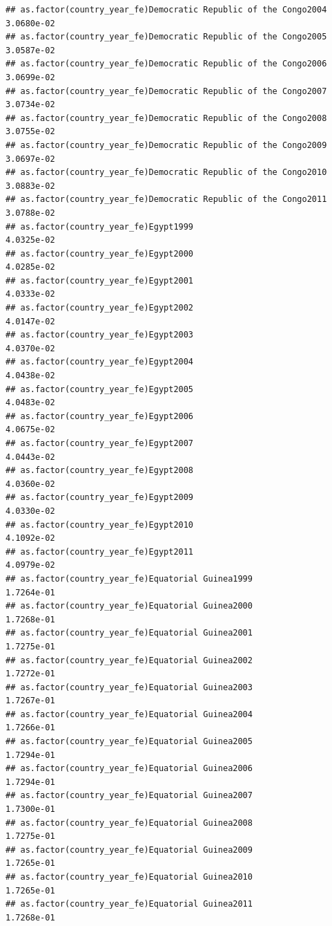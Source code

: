 \documentclass[
  a4paper,
]{article}
\begin{document}
\begin{verbatim}
## as.factor(country_year_fe)Democratic Republic of the Congo2004  3.0680e-02
## as.factor(country_year_fe)Democratic Republic of the Congo2005  3.0587e-02
## as.factor(country_year_fe)Democratic Republic of the Congo2006  3.0699e-02
## as.factor(country_year_fe)Democratic Republic of the Congo2007  3.0734e-02
## as.factor(country_year_fe)Democratic Republic of the Congo2008  3.0755e-02
## as.factor(country_year_fe)Democratic Republic of the Congo2009  3.0697e-02
## as.factor(country_year_fe)Democratic Republic of the Congo2010  3.0883e-02
## as.factor(country_year_fe)Democratic Republic of the Congo2011  3.0788e-02
## as.factor(country_year_fe)Egypt1999                             4.0325e-02
## as.factor(country_year_fe)Egypt2000                             4.0285e-02
## as.factor(country_year_fe)Egypt2001                             4.0333e-02
## as.factor(country_year_fe)Egypt2002                             4.0147e-02
## as.factor(country_year_fe)Egypt2003                             4.0370e-02
## as.factor(country_year_fe)Egypt2004                             4.0438e-02
## as.factor(country_year_fe)Egypt2005                             4.0483e-02
## as.factor(country_year_fe)Egypt2006                             4.0675e-02
## as.factor(country_year_fe)Egypt2007                             4.0443e-02
## as.factor(country_year_fe)Egypt2008                             4.0360e-02
## as.factor(country_year_fe)Egypt2009                             4.0330e-02
## as.factor(country_year_fe)Egypt2010                             4.1092e-02
## as.factor(country_year_fe)Egypt2011                             4.0979e-02
## as.factor(country_year_fe)Equatorial Guinea1999                 1.7264e-01
## as.factor(country_year_fe)Equatorial Guinea2000                 1.7268e-01
## as.factor(country_year_fe)Equatorial Guinea2001                 1.7275e-01
## as.factor(country_year_fe)Equatorial Guinea2002                 1.7272e-01
## as.factor(country_year_fe)Equatorial Guinea2003                 1.7267e-01
## as.factor(country_year_fe)Equatorial Guinea2004                 1.7266e-01
## as.factor(country_year_fe)Equatorial Guinea2005                 1.7294e-01
## as.factor(country_year_fe)Equatorial Guinea2006                 1.7294e-01
## as.factor(country_year_fe)Equatorial Guinea2007                 1.7300e-01
## as.factor(country_year_fe)Equatorial Guinea2008                 1.7275e-01
## as.factor(country_year_fe)Equatorial Guinea2009                 1.7265e-01
## as.factor(country_year_fe)Equatorial Guinea2010                 1.7265e-01
## as.factor(country_year_fe)Equatorial Guinea2011                 1.7268e-01

\end{verbatim}
\end{document}
